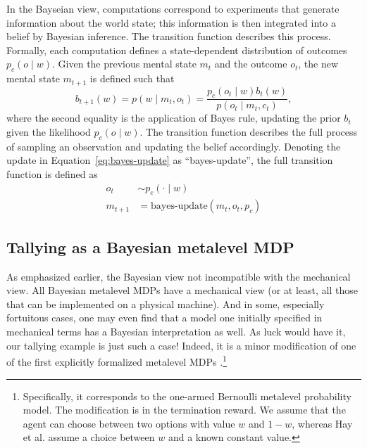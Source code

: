 In the Bayseian view, computations correspond to experiments that generate information about the world state; this information is then integrated into a belief by Bayesian inference. The transition function describes this process. Formally, each computation defines a state-dependent distribution of outcomes $p_c(o \mid w)$. Given the previous mental state $m_t$ and the outcome $o_t$, the new mental state $m_{t+1}$ is defined such that
%
\begin{equation}\label{eq:bayes-update}
  b_{t+1}(w) = p(w \mid m_t, o_t) = \frac{
    p_c(o_t \mid w) b_t(w) 
  }{
    p(o_t \mid m_t, c_t)
  },
\end{equation}
%
where the second equality is the application of Bayes rule, updating the prior $b_t$ given the likelihood $p_c(o \mid w)$. The transition function describes the full process of sampling an observation and updating the belief accordingly. Denoting the update in Equation~\ref{eq:bayes-update} as ``bayes-update'', the full transition function is defined as
%
\begin{equation}
\begin{aligned}
  o_t &\sim p_c(\cdot \mid w) \\
  m_{t+1} &= \text{bayes-update}(m_t, o_t, p_c)
\end{aligned}
\end{equation}

\subsection{Tallying as a Bayesian metalevel MDP}

As emphasized earlier, the Bayesian view not incompatible with the mechanical view. All Bayesian metalevel MDPs have a mechanical view (or at least, all those that can be implemented on a physical machine). And in some, especially fortuitous cases, one may even find that a model one initially specified in mechanical terms has a Bayesian interpretation as well. As luck would have it, our tallying example is just such a case! Indeed, it is a minor modification of one of the first explicitly formalized metalevel MDPs \citep{hay2012selecting}.\footnote{%
  Specifically, it corresponds to the one-armed Bernoulli metalevel probability model. The modification is in the termination reward. We assume that the agent can choose between two options with value $w$ and $1-w$, whereas Hay et al. assume a choice between $w$ and a known constant value.
}

